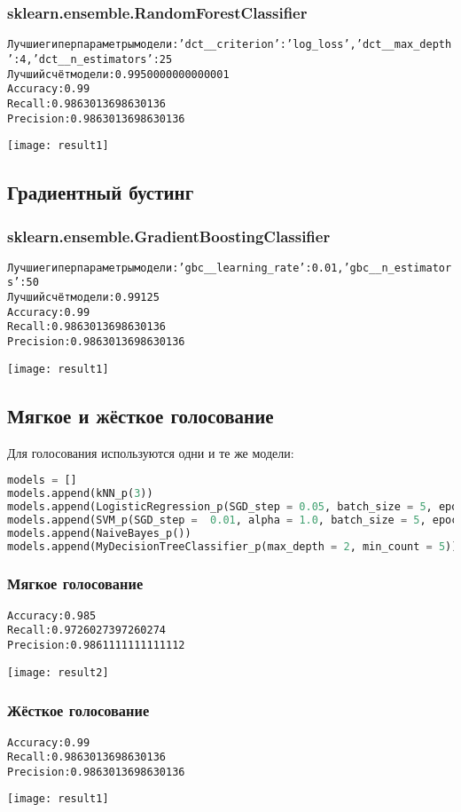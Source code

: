 \subsubsection{sklearn.ensemble.RandomForestClassifier}
\begin{alltt}
Лучшие гиперпараметры модели: {'dct__criterion': 'log_loss', 'dct__max_depth': 4, 'dct__n_estimators': 25}
Лучший счёт модели: 0.9950000000000001
Accuracy: 0.99
Recall: 0.9863013698630136
Precision: 0.9863013698630136
\end{alltt}
\begin{center}
\texttt{[image: result1]}
\end{center}
\pagebreak

\subsection{Градиентный бустинг}
\subsubsection{sklearn.ensemble.GradientBoostingClassifier}
\begin{alltt}
Лучшие гиперпараметры модели: {'gbc__learning_rate': 0.01, 'gbc__n_estimators': 50}
Лучший счёт модели: 0.99125
Accuracy: 0.99
Recall: 0.9863013698630136
Precision: 0.9863013698630136
\end{alltt}
\begin{center}
\texttt{[image: result1]}
\end{center}

\subsection{Мягкое и жёсткое голосование}
Для голосования используются одни и те же модели:
\begin{lstlisting}[language=Python]
models = []
models.append(kNN_p(3))
models.append(LogisticRegression_p(SGD_step = 0.05, batch_size = 5, epoches = 2))
models.append(SVM_p(SGD_step =  0.01, alpha = 1.0, batch_size = 5, epoches = 4))
models.append(NaiveBayes_p())
models.append(MyDecisionTreeClassifier_p(max_depth = 2, min_count = 5))
\end{lstlisting}
\pagebreak

\subsubsection{Мягкое голосование}
\begin{alltt}
Accuracy: 0.985
Recall: 0.9726027397260274
Precision: 0.9861111111111112
\end{alltt}
\begin{center}
\texttt{[image: result2]}
\end{center}

\subsubsection{Жёсткое голосование}
\begin{alltt}
Accuracy: 0.99
Recall: 0.9863013698630136
Precision: 0.9863013698630136
\end{alltt}
\begin{center}
\texttt{[image: result1]}
\end{center}
\pagebreak

\pagebreak
